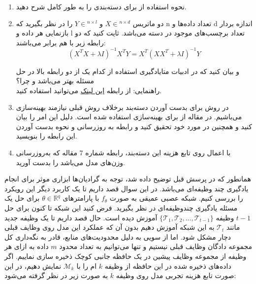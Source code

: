 \documentclass{article}
\begin{document}
\begin{enumerate}
	\item
	نحوه استفاده از 
	برای دسته‌بندی را به طور کامل شرح دهید.
	\item
	دو ماتریس
	$X \in {^{n \times d}}$
	و
	$Y \in {^{n \times l}}$
	را در نظر بگیرید که n تعداد داده‌ها و d اندازه بردار باز‌نمایی هر داده و l تعداد برچسب‌های موجود در دسته می‌باشد. ثایت کنید که دو رابطه زیر با هم برابر می‌باشند:
	$$
	{\left( {{X^T}X + \lambda I} \right)^{ - 1}}{X^T}Y = {X^T}{\left( {X{X^T} + \lambda I} \right)^{ - 1}}Y
	$$
	
	و بیان کنید که در ادبیات متایادگیری استفاده از کدام یک از دو رابطه بالا در حل مسئله بهتر می‌باشد و چرا؟
	\\
	راهنمایی: از رابطه
	\href{https://en.wikipedia.org/wiki/Woodbury_matrix_identity}{این لینک}
	می‌توانید استفاده کنید.
	
	\item
	در روش
	برای بدست آوردن دسته‌بند برخلاف روش قبلی نیازمند بهینه‌سازی می‌باشیم. در مقاله از
	برای بهینه‌سازی استفاده شده است. دلیل این امر را بیان کنید و همچنین در مورد خود
	تحقیق کنید و رابطه به روزرسانی و نحوه بدست آوردن این رابطه را بنویسید.
	
	\item
	با اعمال
	روی تابع هزینه این دسته‌بند، رابطه شماره 7 مقاله که به‌روزرسانی وزن‌های مدل می‌باشد را بدست آورید.


\end{enumerate}

همانطور که در پرسش قبل توضیح داده شد، توجه به گرادیان‌ها ابزاری موثر برای انجام یادگیری چند وظیفه‌ای 
می‌باشد. در این سوال قصد داریم تا یک کاربرد دیگر این رویکرد را بررسی کنیم.
شبکه عصبی عمیقی به صورت 
$f_\theta$
با پارامترهای
$\theta \in \mathbb{R}^q$
برای حل یک مسئله
یادگیری
چندوظیفه‌ای
در نظر بگیرید.
فرض کنید این شبکه تا کنون برای حل
$t-1$
وظیفه 
$\{\mathcal{T}_1, \mathcal{T}_2, ..., \mathcal{T}_{t-1}\}$
آموزش دیده است.
حال قصد داریم تا یک وظیفه جدید 
مانند
$\mathcal{T}_t$
به این شبکه آموزش دهیم بدون آن که عملکرد این مدل روی وظایف قبلی دچار مشکل شود.
اما از سویی به دلیل محدودیت‌های منابع، قادر به نگه‌داری کل
مجموعه دادگان وظایف قبلی نیستیم و تنها می‌توانیم به تعداد محدود 
$m$
داده به ازای هر وظیفه از مجموعه وظایف پیشین در یک حافظه جانبی کوچک ذخیره سازی نماییم.
اگر داده‌های ذخیره شده در این حافظه از وظیفه
$k$
ام را با
$\mathcal{M}_k$
نمایش دهیم، در این صورت
تابع
هزینه تجربی مدل روی وظیفه 
$k$
به صورت زیر در نظر گرفته می‌شود:
\end{document}
